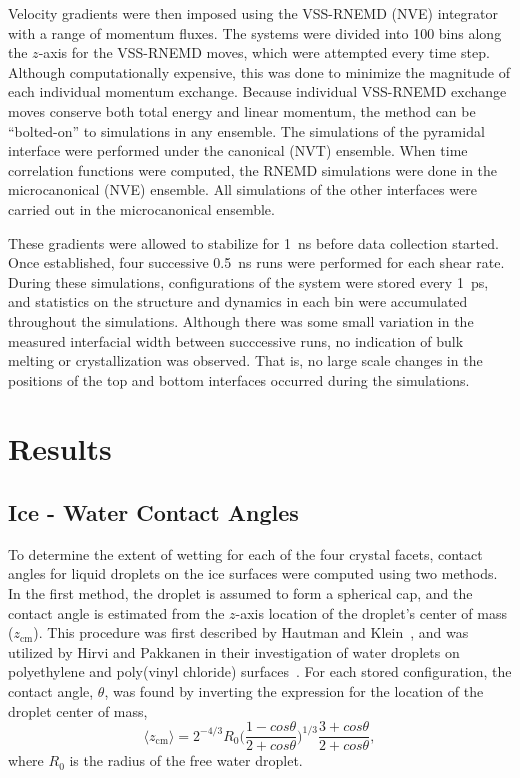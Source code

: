 \documentclass[aps,jcp,preprint,showpacs,superscriptaddress,groupedaddress]{revtex4}  %
\begin{document}
Velocity gradients were then imposed using the VSS-RNEMD (NVE)
integrator with a range of momentum fluxes.  The systems were divided
into 100 bins along the $z$-axis for the VSS-RNEMD moves, which were
attempted every time step.  Although computationally expensive, this
was done to minimize the magnitude of each individual momentum
exchange.  Because individual VSS-RNEMD exchange moves conserve both
total energy and linear momentum, the method can be ``bolted-on'' to
simulations in any ensemble.  The simulations of the pyramidal
interface were performed under the canonical (NVT) ensemble.  When
time correlation functions were computed, the RNEMD simulations were
done in the microcanonical (NVE) ensemble.  All simulations of the
other interfaces were carried out in the microcanonical ensemble.

These gradients were allowed to stabilize for 1~ns before data
collection started. Once established, four successive 0.5~ns runs were
performed for each shear rate.  During these simulations,
configurations of the system were stored every 1~ps, and statistics on
the structure and dynamics in each bin were accumulated throughout the
simulations.  Although there was some small variation in the measured
interfacial width between succcessive runs, no indication of bulk
melting or crystallization was observed.  That is, no large scale
changes in the positions of the top and bottom interfaces occurred
during the simulations.

\section{Results}
\subsection{Ice - Water Contact Angles}
To determine the extent of wetting for each of the four crystal
facets, contact angles for liquid droplets on the ice surfaces were
computed using two methods.  In the first method, the droplet is
assumed to form a spherical cap, and the contact angle is estimated
from the $z$-axis location of the droplet's center of mass
($z_\mathrm{cm}$).  This procedure was first described by Hautman and
Klein~\cite{Hautman91}, and was utilized by Hirvi and Pakkanen in
their investigation of water droplets on polyethylene and poly(vinyl
chloride) surfaces~\cite{Hirvi06}. For each stored configuration, the
contact angle, $\theta$, was found by inverting the expression for the
location of the droplet center of mass,
\begin{equation}\label{contact_1}
\langle z_\mathrm{cm}\rangle = 2^{-4/3}R_{0}\bigg(\frac{1-cos\theta}{2+cos\theta}\bigg)^{1/3}\frac{3+cos\theta}{2+cos\theta} ,
\end{equation}
where $R_{0}$ is the radius of the free water droplet. 
\end{document}
